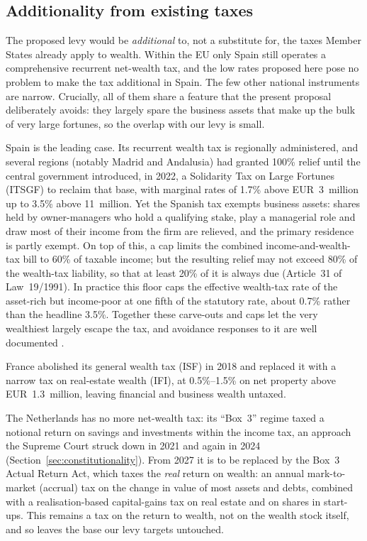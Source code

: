 \documentclass[../../main]{subfiles}
\begin{document}
\subsection{Additionality from existing taxes}
\label{sec:interaction}

The proposed levy would be \emph{additional} to, not a substitute for, the taxes Member States already apply to wealth. Within the EU only Spain still operates a comprehensive recurrent net-wealth tax, and the low rates proposed here pose no problem to make the tax additional in Spain. The few other national instruments are narrow. Crucially, all of them share a feature that the present proposal deliberately avoids: they largely spare the business assets that make up the bulk of very large fortunes, so the overlap with our levy is small. %

Spain is the leading case. Its recurrent wealth tax is regionally administered, and several regions (notably Madrid and Andalusia) had granted 100\% relief until the central government introduced, in 2022, a Solidarity Tax on Large Fortunes (ITSGF) to reclaim that base, with marginal rates of 1.7\% above EUR~3~million up to 3.5\% above 11~million. %
Yet the Spanish tax exempts business assets: shares held by owner-managers who hold a qualifying stake, play a managerial role and draw most of their income from the firm are relieved, and the primary residence is partly exempt.
On top of this, a cap limits the combined income-and-wealth-tax bill to 60\% of taxable income; but the resulting relief may not exceed 80\% of the wealth-tax liability, so that at least 20\% of it is always due (Article~31 of Law~19/1991). In practice this floor caps the effective wealth-tax rate of the asset-rich but income-poor at one fifth of the statutory rate, about 0.7\% rather than the headline 3.5\%. Together these carve-outs and caps let the very wealthiest largely escape the tax, and avoidance responses to it are well documented \citep{DGTaxud2026}.

France abolished its general wealth tax (ISF) in 2018 and replaced it with a narrow tax on real-estate wealth (IFI), at 0.5\%--1.5\% on net property above EUR~1.3~million, leaving financial and business wealth untaxed.

The Netherlands has no more net-wealth tax: its ``Box~3'' regime taxed a notional return on savings and investments within the income tax, an approach the Supreme Court struck down in 2021 and again in 2024 (Section~\ref{sec:constitutionality}). From 2027 it is to be replaced by the Box~3 Actual Return Act, which taxes the \emph{real} return on wealth: an annual mark-to-market (accrual) tax on the change in value of most assets and debts, combined with a realisation-based capital-gains tax on real estate and on shares in start-ups. This remains a tax on the return to wealth, not on the wealth stock itself, and so leaves the base our levy targets untouched.
\end{document}
